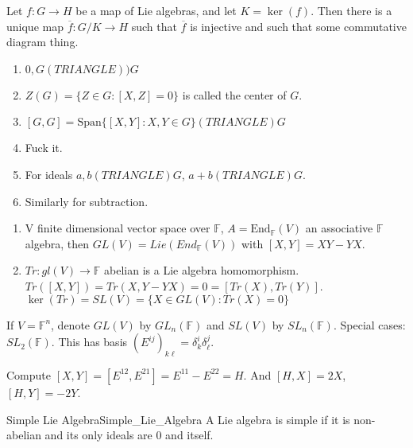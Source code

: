 \documentclass[crop=false,class=article]{standalone}                           %
\begin{document}
        \begin{theorem}
            Let $f:G\rightarrow{H}$ be a map of Lie algebras, and let
            $K=\ker(f)$. Then there is a unique map
            $\overline{f}:G/K\rightarrow{H}$ such that $\overline{f}$ is
            injective and such that some commutative diagram thing.
        \end{theorem}
        \begin{example}
            \begin{enumerate}
                \item $0,G(TRIANGLE))G$
                \item $Z(G)=\{Z\in{G}:[X,Z]=0\}$ is called the center of $G$.
                \item $[G,G]=\textrm{Span}\{[X,Y]:X,Y\in{G}\}(TRIANGLE)G$
                \item Fuck it.
                \item For ideals $a,b(TRIANGLE)G$, $a+b(TRIANGLE)G$.
                \item Similarly for subtraction.
            \end{enumerate}
        \end{example}
        \begin{example}
            \begin{enumerate}
                \item V finite dimensional vector space over $\mathbb{F}$,
                      $A=\textrm{End}_{\mathbb{F}}(V)$ an associative
                      $\mathbb{F}$ algebra, then
                      $GL(V)=Lie(End_{\mathbb{F}}(V))$
                      with $[X,Y]=XY-YX$.
                \item $Tr:gl(V)\rightarrow\mathbb{F}$ abelian is a Lie algebra
                      homomorphism. $Tr([X,Y])=Tr(X,Y-YX)=0=[Tr(X),Tr(Y)]$.
                      $\ker(Tr)=SL(V)=\{X\in{GL}(V):Tr(X)=0\}$
            \end{enumerate}
        \end{example}
        If $V=\mathbb{F}^{n}$, denote $GL(V)$ by $GL_{n}(\mathbb{F})$ and $SL(V)$
        by $SL_{n}(\mathbb{F})$. Special cases: $SL_{2}(\mathbb{F})$. This has basis
        $(E^{ij})_{k\ell}=\delta^{i}_{k}\delta^{j}_{\ell}$.
        \begin{example}
            Compute $[X,Y]=[E^{12},E^{21}]=E^{11}-E^{22}=H$.
            And $[H,X]=2X$, $[H,Y]=\minus{2}Y$.
        \end{example}
        \begin{ldefinition}{Simple Lie Algebra}{Simple_Lie_Algebra}
            A Lie algebra is simple if it is non-abelian and its only ideals are
            $0$ and itself.
        \end{ldefinition}
\end{document}
